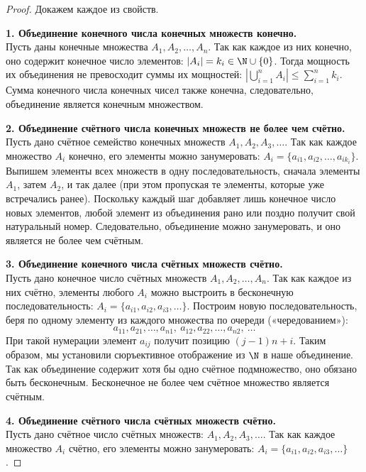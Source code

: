 \vspace{1em}

\begin{proof}
    Докажем каждое из свойств.

    \textbf{1. Объединение конечного числа конечных множеств конечно.} \\
    Пусть даны конечные множества $A_1, A_2, \dots, A_n$. Так как каждое из них конечно, оно содержит конечное число элементов: $|A_i| = k_i \in \N \cup \{0\}$. Тогда мощность их объединения не превосходит суммы их мощностей: $\left|\bigcup_{i=1}^n A_i\right| \le \sum_{i=1}^n k_i$. Сумма конечного числа конечных чисел также конечна, следовательно, объединение является конечным множеством.

    \vspace{1em}
    \textbf{2. Объединение счётного числа конечных множеств не более чем счётно.} \\
    Пусть дано счётное семейство конечных множеств $A_1, A_2, A_3, \dots$. Так как каждое множество $A_i$ конечно, его элементы можно занумеровать: $A_i = \{a_{i1}, a_{i2}, \dots, a_{ik_i}\}$. Выпишем элементы всех множеств в одну последовательность, сначала элементы $A_1$, затем $A_2$, и так далее (при этом пропуская те элементы, которые уже встречались ранее). Поскольку каждый шаг добавляет лишь конечное число новых элементов, любой элемент из объединения рано или поздно получит свой натуральный номер. Следовательно, объединение можно занумеровать, и оно является не более чем счётным.

    \vspace{1em}
    \textbf{3. Объединение конечного числа счётных множеств счётно.} \\
    Пусть дано конечное число счётных множеств $A_1, A_2, \dots, A_n$. Так как каждое из них счётно, элементы любого $A_i$ можно выстроить в бесконечную последовательность: $A_i = \{a_{i1}, a_{i2}, a_{i3}, \dots\}$. Построим новую последовательность, беря по одному элементу из каждого множества по очереди («чередованием»): 
    \[a_{11}, a_{21}, \dots, a_{n1}, \ a_{12}, a_{22}, \dots, a_{n2}, \ \dots\]
    При такой нумерации элемент $a_{ij}$ получит позицию $(j-1)n + i$. Таким образом, мы установили сюръективное отображение из $\N$ в наше объединение. Так как объединение содержит хотя бы одно счётное подмножество, оно обязано быть бесконечным. Бесконечное не более чем счётное множество является счётным.

    \vspace{1em}
    \textbf{4. Объединение счётного числа счётных множеств счётно.} \\
    Пусть дано счётное число счётных множеств: $A_1, A_2, A_3, \dots$. 
    Так как каждое множество $A_i$ счётно, его элементы можно занумеровать: 
    $A_i = \{a_{i1}, a_{i2}, a_{i3}, \dots\}$.
    

\end{proof}
